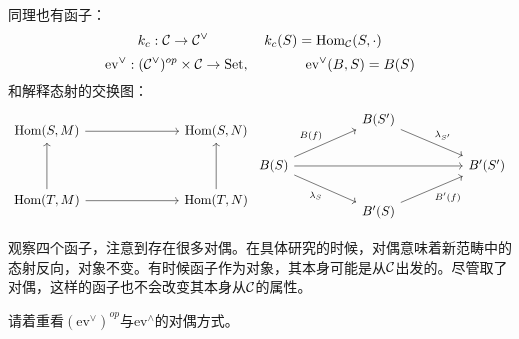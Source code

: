     同理也有函子：
    $$
    k_c: \mathcal{C}  \to \mathcal{C}^{\vee} \quad \quad \qquad k_c(S)=\text{Hom}_{\mathcal{C}}(S,\cdot)
    $$
    $$
    \text{ev}^{\vee}:(\mathcal{C}^{\vee})^{op}\times \mathcal{C} \to \text{Set}, \quad \quad \qquad \text{ev}^{\vee}(B,S)=B(S)
    $$
    和解释态射的交换图：
    \[
        \centering
        \begin{tikzcd}
            {\text{Hom}(S,M)} &&& {\text{Hom}(S,N)} \\
            \\
            {\text{Hom}(T,M)} &&& {\text{Hom}(T,N)}
            \arrow[from=1-1, to=1-4]
            \arrow[from=3-1, to=3-4]
            \arrow[from=3-1, to=1-1]
            \arrow[from=3-4, to=1-4]
        \end{tikzcd}
        \begin{tikzcd}
            && {B(S')} \\
            {B(S)} &&&& {B'(S')} \\
            && {B'(S)}
            \arrow["{B(f)}", from=2-1, to=1-3]
            \arrow["{\lambda_{S'}}", from=1-3, to=2-5]
            \arrow["{\lambda_{S}}"', from=2-1, to=3-3]
            \arrow["{B'(f)}"', from=3-3, to=2-5]
            \arrow[from=2-1, to=2-5]
        \end{tikzcd}
    \]

    观察四个函子，注意到存在很多对偶。在具体研究的时候，对偶意味着新范畴中的态射反向，对象不变。有时候函子作为对象，其本身可能是从$\mathcal{C}$出发的。尽管取了对偶，这样的函子也不会改变其本身从$\mathcal{C}$的属性。

    请着重看$(\text{ev}^{\vee})^{op}$与$\text{ev}^{\wedge}$的对偶方式。

